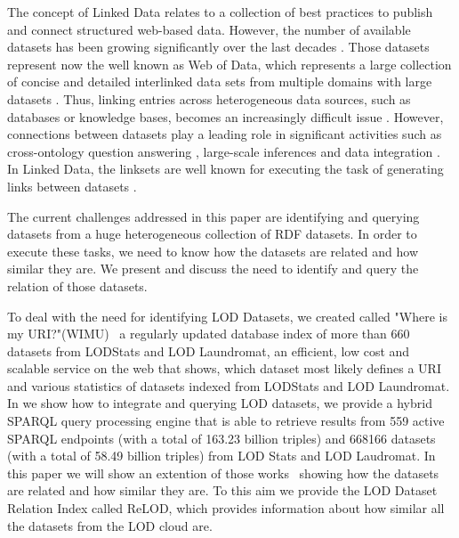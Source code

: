 \documentclass[sw]{iosart2x}
\begin{document}

The concept of Linked Data relates to a collection of best practices to publish and connect structured web-based data.
However, the number of available datasets has been growing significantly over the last decades \cite{bizer2011linked}.
Those datasets represent now the well known as Web of Data, which represents a large collection of concise and detailed interlinked data sets from multiple domains with large datasets \cite{saleem2013linked}.
Thus, linking entries across heterogeneous data sources, such as databases or knowledge bases, becomes an increasingly difficult issue \cite{valdestilhas2017high, NGAU11, saeedi2018scalable}.
However, connections between datasets play a leading role in significant activities such as cross-ontology question answering \cite{lopez2009cross}, large-scale inferences \cite{urbani2010owl} and data integration \cite{rahm2016case}.
In Linked Data, the linksets are well known for executing the task of generating links between datasets \cite{NGAU11}.

The current challenges addressed in this paper are identifying and querying datasets from a huge heterogeneous collection of RDF datasets.
In order to execute these tasks, we need to know how the datasets are related and how similar they are.
We present and discuss the need to identify and query the relation of those datasets.

To deal with the need for identifying LOD Datasets, we created called "Where is my URI?"(WIMU)~\cite{valdestilhas2018my} a regularly updated database index of more than \SI{660}{\kilo\nothing} datasets from LODStats and LOD Laundromat, an efficient, low cost and scalable service on the web that shows, which dataset most likely defines a URI and various statistics of datasets indexed from LODStats and LOD Laundromat.
In \cite{valdestilhas2019more} we show how to integrate and querying LOD datasets, we provide a hybrid SPARQL query processing engine that is able to retrieve results from 559 active SPARQL endpoints (with a total of 163.23 billion triples) and \num{668166} datasets (with a total of 58.49 billion triples) from LOD Stats and LOD Laudromat.
In this paper we will show an extention of those works~\cite{valdestilhas2018my, valdestilhas2019more} showing how the datasets are related and how similar they are.
To this aim we provide the LOD Dataset Relation Index called ReLOD, which provides information about how similar all the datasets from the LOD cloud are.%
\end{document}
